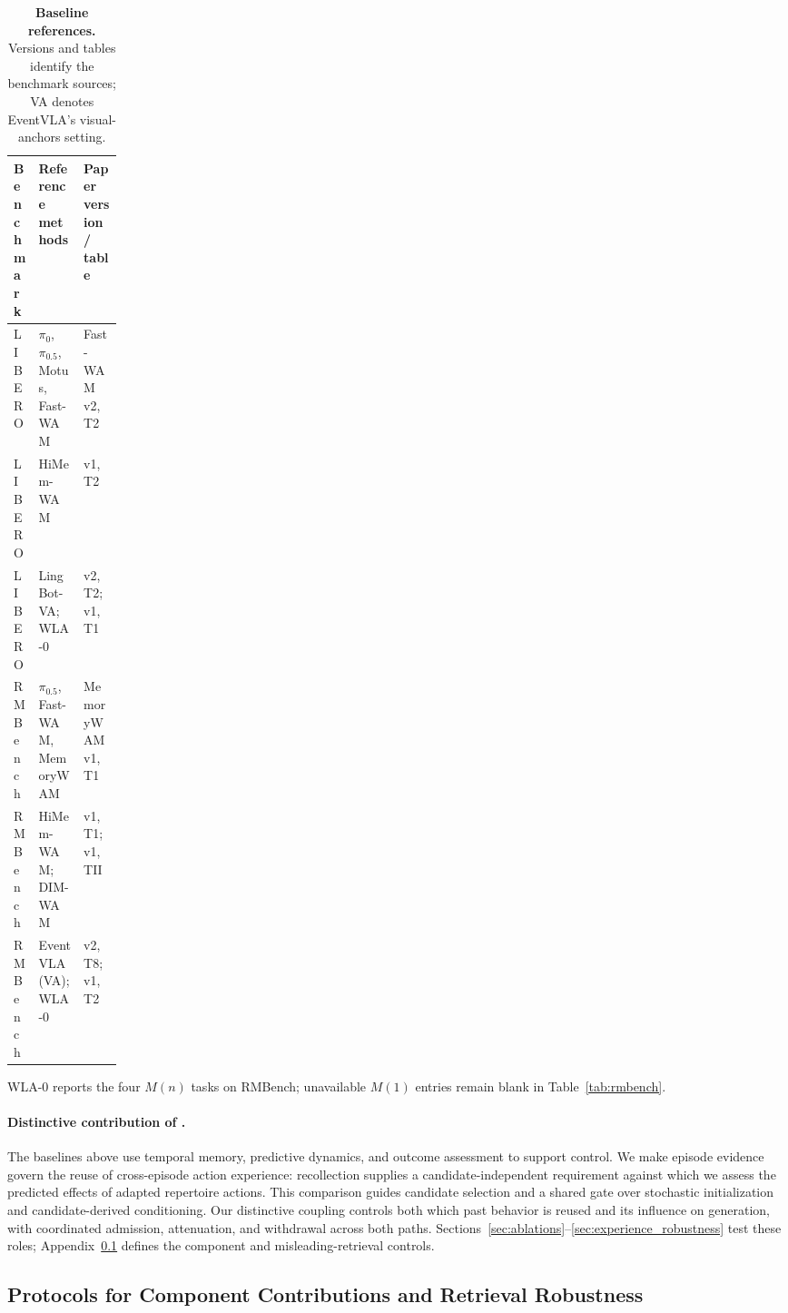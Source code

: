\begin{table}[H]
\centering\small
\caption{\textbf{Baseline references.} Versions and tables identify the benchmark sources; VA denotes EventVLA's visual-anchors setting.}
\label{tab:app_baseline_sources}
\begin{tabularx}{\linewidth}{@{}p{0.14\linewidth}Xl@{}}
\toprule
Benchmark & Reference methods & Paper version / table \\
\midrule
LIBERO & $\pi_0$, $\pi_{0.5}$, Motus, Fast-WAM & Fast-WAM v2, T2~\citep{yuan2026fastwam} \\
LIBERO & HiMem-WAM & v1, T2~\citep{sun2026himem} \\
LIBERO & LingBot-VA; WLA-0 & v2, T2; v1, T1~\citep{li2026lingbotva,yang2026wla} \\
RMBench & $\pi_{0.5}$, Fast-WAM, MemoryWAM & MemoryWAM v1, T1~\citep{yang2026memorywam} \\
RMBench & HiMem-WAM; DIM-WAM & v1, T1; v1, TII~\citep{sun2026himem,wang2026dimwam} \\
RMBench & EventVLA (VA); WLA-0 & v2, T8; v1, T2~\citep{yang2026eventvla,yang2026wla} \\
\bottomrule
\end{tabularx}
\end{table}
WLA-0 reports the four $M(n)$ tasks on RMBench; unavailable $M(1)$ entries remain blank in Table~\ref{tab:rmbench}.

\paragraph{Distinctive contribution of \method{}.}
The baselines above use temporal memory, predictive dynamics, and outcome assessment to support control.
We make episode evidence govern the reuse of cross-episode action experience: recollection supplies a candidate-independent requirement against which we assess the predicted effects of adapted repertoire actions.
This comparison guides candidate selection and a shared gate over stochastic initialization and candidate-derived conditioning.
Our distinctive coupling controls both which past behavior is reused and its influence on generation, with coordinated admission, attenuation, and withdrawal across both paths.
Sections~\ref{sec:ablations}--\ref{sec:experience_robustness} test these roles; Appendix~\ref{app:ablation_defs} defines the component and misleading-retrieval controls.

\subsection{Protocols for Component Contributions and Retrieval Robustness}
\label{app:ablation_defs}
\label{app:semantics}

